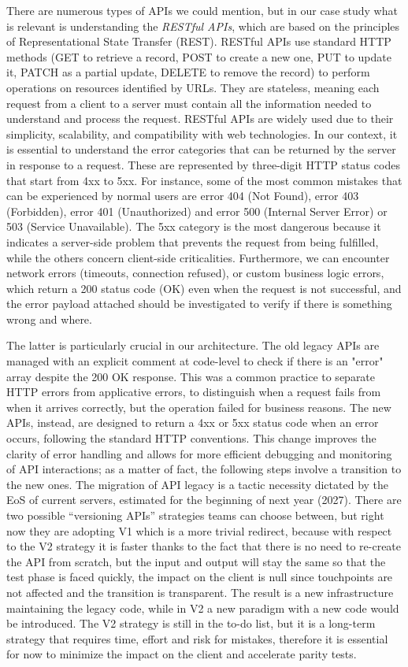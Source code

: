 \documentclass[12pt,a4paper,openright,twoside]{book}
\begin{document}
There are numerous types of APIs we could mention, but in our case study what is relevant is understanding the \textit{RESTful APIs}, which are based on the principles of Representational State Transfer (REST). RESTful APIs use standard HTTP methods (GET to retrieve a record, POST to create a new one, PUT to update it, PATCH as a partial update, DELETE to remove the record) to perform operations on resources identified by URLs. They are stateless, meaning each request from a client to a server must contain all the information needed to understand and process the request. RESTful APIs are widely used due to their simplicity, scalability, and compatibility with web technologies. In our context, it is essential to understand the error categories that can be returned by the server in response to a request. These are represented by three-digit HTTP status codes that start from 4xx to 5xx. For instance, some of the most common mistakes that can be experienced by normal users are error 404 (Not Found), error 403 (Forbidden), error 401 (Unauthorized) and error 500 (Internal Server Error) or 503 (Service Unavailable). The 5xx category is the most dangerous because it indicates a server-side problem that prevents the request from being fulfilled, while the others concern client-side criticalities. Furthermore, we can encounter network errors (timeouts, connection refused), or custom business logic errors, which return a 200 status code (OK) even when the request is not successful, and the error payload attached should be investigated to verify if there is something wrong and where. 

The latter is particularly crucial in our architecture. The old legacy APIs are managed with an explicit comment at code-level to check if there is an "error" array despite the 200 OK response. This was a common practice to separate HTTP errors from applicative errors, to distinguish when a request fails from when it arrives correctly, but the operation failed for business reasons. The new APIs, instead, are designed to return a 4xx or 5xx status code when an error occurs, following the standard HTTP conventions. This change improves the clarity of error handling and allows for more efficient debugging and monitoring of API interactions; as a matter of fact, the following steps involve a transition to the new ones. The migration of API legacy is a tactic necessity dictated by the \ac{EoS} of current servers, estimated for the beginning of next year (2027). There are two possible ``versioning APIs'' strategies teams can choose between, but right now they are adopting V1 which is a more trivial redirect, because with respect to the V2 strategy it is faster thanks to the fact that there is no need to re-create the API from scratch, but the input and output will stay the same so that the test phase is faced quickly, the impact on the client is null since touchpoints are not affected and the transition is transparent. The result is a new infrastructure maintaining the legacy code, while in V2 a new paradigm with a new code would be introduced. The V2 strategy is still in the to-do list, but it is a long-term strategy that requires time, effort and risk for mistakes, therefore it is essential for now to minimize the impact on the client and accelerate parity tests.
\end{document}
